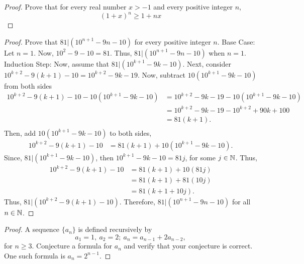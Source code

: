 \documentclass[12pt]{article}
\begin{document}
    \begin{proof}{Prove that for every real number \(x>-1\) and every positive integer \(n\), \begin{equation*}
        (1+x)^n\geq 1+nx
    \end{equation*}}
    
    \end{proof}
    \begin{proof}{Prove that \(81|(10^{n+1}-9n-10) \) for every positive integer \(n\).}
        Base Case: Let \(n=1\). Now, \(10^2-9 - 10 = 81\). Thus, \(81|(10^{n+1}-9n-10)\) when \(n=1\).\\
        Induction Step: Now, assume that \(81|(10^{k+1}-9k-10)\). Next, consider \(10^{k+2}-9(k+1)-10 = 10^{k+2} - 9k -19\). Now, subtract \(10(10^{k+1} -9k-10)\) from both sides
        \begin{equation*}
            \begin{split}
                10^{k+2}-9(k+1)-10 - 10(10^{k+1} -9k-10) &= 10^{k+2} - 9k -19 - 10(10^{k+1} -9k-10)\\
                &=10^{k+2} - 9k -19 - 10^{k+2} + 90k + 100\\
                &= 81(k+1).\\
            \end{split}
        \end{equation*}
        Then, add \(10(10^{k+1} -9k-10)\) to both sides,
        \begin{equation*}
            \begin{split}
                10^{k+2}-9(k+1)-10 &= 81(k+1) + 10(10^{k+1} -9k-10).
            \end{split}
        \end{equation*}
        Since, \(81|(10^{k+1}-9k-10)\), then \(10^{k+1}-9k-10=81j\), for some \(j\in\mathbb{N}\). Thus, 
        \begin{equation*}
            \begin{split}
                10^{k+2}-9(k+1)-10 &= 81(k+1) + 10(81j)\\
                &=81(k+1) + 81(10j)\\
                &=81(k+1+10j).
            \end{split}
        \end{equation*}
        Thus, \(81|(10^{k+2}-9(k+1)-10)\). Therefore, \(81|(10^{n+1}-9n-10) \) for all \(n\in\mathbb{N}\).
    \end{proof}
    \begin{proof}{A sequence \(\{a_n\}\) is defined recursively by
        \begin{equation*}
            a_1 = 1,\ a_2=2;\ a_n=a_{n-1} + 2a_{n-2},
        \end{equation*}
        for \(n\geq3\). Conjecture a formula for \(a_n\) and verify that your conjecture is correct.\\
        One such formula is \(a_n=2^{n-1}\).}
                    
    \end{proof}
\end{document}
